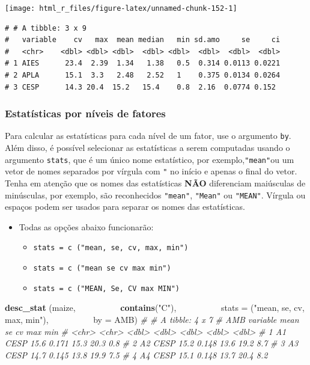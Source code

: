 \documentclass[
]{book}
\newenvironment{Shaded}{\begin{snugshade}}{\end{snugshade}}
\newcommand{\CommentTok}[1]{\textcolor[rgb]{0.56,0.35,0.01}{\textit{#1}}}
\newcommand{\DataTypeTok}[1]{\textcolor[rgb]{0.13,0.29,0.53}{#1}}
\newcommand{\KeywordTok}[1]{\textcolor[rgb]{0.13,0.29,0.53}{\textbf{#1}}}
\newcommand{\NormalTok}[1]{#1}
\newcommand{\StringTok}[1]{\textcolor[rgb]{0.31,0.60,0.02}{#1}}
\providecommand{\tightlist}{%
  \setlength{\itemsep}{0pt}\setlength{\parskip}{0pt}}
\begin{document}
\texttt{[image: html\_r\_files/figure-latex/unnamed-chunk-152-1]}

\begin{verbatim}
# # A tibble: 3 x 9
#   variable    cv   max  mean median   min sd.amo     se     ci
#   <chr>    <dbl> <dbl> <dbl>  <dbl> <dbl>  <dbl>  <dbl>  <dbl>
# 1 AIES      23.4  2.39  1.34   1.38   0.5  0.314 0.0113 0.0221
# 2 APLA      15.1  3.3   2.48   2.52   1    0.375 0.0134 0.0264
# 3 CESP      14.3 20.4  15.2   15.4    0.8  2.16  0.0774 0.152
\end{verbatim}

\hypertarget{estatuxedsticas-por-nuxedveis-de-fatores}{%
\subsubsection{Estatísticas por níveis de fatores}\label{estatuxedsticas-por-nuxedveis-de-fatores}}

Para calcular as estatísticas para cada nível de um fator, use o argumento \texttt{by}. Além disso, é possível selecionar as estatísticas a serem computadas usando o argumento \texttt{stats}, que é um único nome estatístico, por exemplo,\texttt{"mean"}ou um vetor de nomes separados por vírgula com \texttt{"} no início e apenas o final do vetor. Tenha em atenção que os nomes das estatísticas \textbf{NÃO} diferenciam maiúsculas de minúsculas, por exemplo, são reconhecidos \texttt{"mean"}, \texttt{"Mean"} ou \texttt{"MEAN"}. Vírgula ou espaços podem ser usados para separar os nomes das estatísticas.

\begin{itemize}
\item
  Todas as opções abaixo funcionarão:

  \begin{itemize}
  \tightlist
  \item
    \texttt{stats\ =\ c\ ("mean,\ se,\ cv,\ max,\ min")}
  \item
    \texttt{stats\ =\ c\ ("mean\ se\ cv\ max\ min")}
  \item
    \texttt{stats\ =\ c\ ("MEAN,\ Se,\ CV\ max\ MIN")}
  \end{itemize}
\end{itemize}

\begin{Shaded}
\begin{Highlighting}[]
\KeywordTok{desc_stat}\NormalTok{ (maize,}
          \KeywordTok{contains}\NormalTok{(}\StringTok{"C"}\NormalTok{),}
          \DataTypeTok{stats =}\NormalTok{ (}\StringTok{"mean, se, cv, max, min"}\NormalTok{),}
          \DataTypeTok{by =}\NormalTok{ AMB)}
\CommentTok{# # A tibble: 4 x 7}
\CommentTok{#   AMB   variable  mean    se    cv   max   min}
\CommentTok{#   <chr> <chr>    <dbl> <dbl> <dbl> <dbl> <dbl>}
\CommentTok{# 1 A1    CESP      15.6 0.171  15.3  20.3   0.8}
\CommentTok{# 2 A2    CESP      15.2 0.148  13.6  19.2   8.7}
\CommentTok{# 3 A3    CESP      14.7 0.145  13.8  19.9   7.5}
\CommentTok{# 4 A4    CESP      15.1 0.148  13.7  20.4   8.2}
\end{Highlighting}
\end{Shaded}
\end{document}
